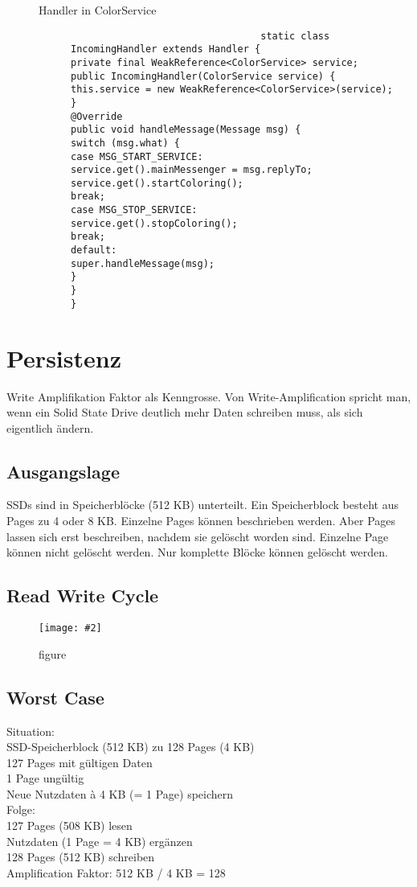 \documentclass[a4paper,10pt,titlepage=false]{scrreprt}
\newcommand{\pic}[2][figure]{\begin{figure}[h]
 \centering
 \texttt{[image: \#2]}
 \caption{#1}
\end{figure}
}
\begin{document}
\begin{description}
\begin{description}
\begin{lstlisting}
                         \end{lstlisting}
\item [Handler in ColorService] \begin{lstlisting}
                                 static class IncomingHandler extends Handler {
private final WeakReference<ColorService> service;
public IncomingHandler(ColorService service) {
this.service = new WeakReference<ColorService>(service);
}
@Override
public void handleMessage(Message msg) {
switch (msg.what) {
case MSG_START_SERVICE:
service.get().mainMessenger = msg.replyTo;
service.get().startColoring();
break;
case MSG_STOP_SERVICE:
service.get().stopColoring();
break;
default:
super.handleMessage(msg);
}
}
}

                                \end{lstlisting}

\end{description}

\end{description}




\chapter{Persistenz}
Write Amplifikation Faktor als Kenngrosse. Von Write-Amplification spricht man, wenn ein
Solid State Drive deutlich mehr Daten schreiben
muss, als sich eigentlich ändern.
\section{Ausgangslage} %
\label{sec:ausgangslage}
SSDs sind in Speicherblöcke (512 KB) unterteilt.
 Ein Speicherblock besteht aus Pages zu 4 oder
8 KB.
 Einzelne Pages können beschrieben werden.
Aber Pages lassen sich erst beschreiben,
nachdem sie gelöscht worden sind.
 Einzelne Page können nicht gelöscht werden.
Nur komplette Blöcke können gelöscht werden.
\section{Read Write Cycle}
\pic{rwcyc.png}
\section{Worst Case}
Situation:\\
SSD-Speicherblock (512 KB) zu 128 Pages (4 KB)\\
127 Pages mit gültigen Daten\\
1 Page ungültig\\
Neue Nutzdaten à 4 KB (= 1 Page) speichern\\
 Folge:\\
127 Pages (508 KB) lesen\\
Nutzdaten (1 Page = 4 KB) ergänzen\\
128 Pages (512 KB) schreiben\\
 Amplification Faktor: 512 KB / 4 KB = 128\\
\end{document}
